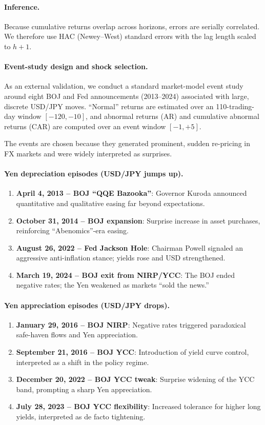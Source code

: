\documentclass[12pt,a4paper]{article}
\begin{document}
\paragraph{Inference.} Because cumulative returns overlap across horizons, errors are serially correlated. We therefore use HAC (Newey--West) standard errors with the lag length scaled to $h+1$.

\paragraph{Event-study design and shock selection.}

As an external validation, we conduct a standard market-model event study \citep{mackinlay1997} around eight BOJ and Fed announcements (2013--2024) associated with large, discrete USD/JPY moves. ``Normal'' returns are estimated over an 110-trading-day window $[-120,-10]$, and abnormal returns (AR) and cumulative abnormal returns (CAR) are computed over an event window $[-1,+5]$.

The events are chosen because they generated prominent, sudden re-pricing in FX markets and were widely interpreted as surprises.

\paragraph{Yen depreciation episodes (USD/JPY jumps up).}
\begin{enumerate}
\item \textbf{April 4, 2013 -- BOJ ``QQE Bazooka''}: Governor Kuroda announced quantitative and qualitative easing far beyond expectations.
\item \textbf{October 31, 2014 -- BOJ expansion}: Surprise increase in asset purchases, reinforcing ``Abenomics''-era easing.
\item \textbf{August 26, 2022 -- Fed Jackson Hole}: Chairman Powell signaled an aggressive anti-inflation stance; yields rose and USD strengthened.
\item \textbf{March 19, 2024 -- BOJ exit from NIRP/YCC}: The BOJ ended negative rates; the Yen weakened as markets ``sold the news.''
\end{enumerate}

\paragraph{Yen appreciation episodes (USD/JPY drops).}
\begin{enumerate}
\item \textbf{January 29, 2016 -- BOJ NIRP}: Negative rates triggered paradoxical safe-haven flows and Yen appreciation.
\item \textbf{September 21, 2016 -- BOJ YCC}: Introduction of yield curve control, interpreted as a shift in the policy regime.
\item \textbf{December 20, 2022 -- BOJ YCC tweak}: Surprise widening of the YCC band, prompting a sharp Yen appreciation.
\item \textbf{July 28, 2023 -- BOJ YCC flexibility}: Increased tolerance for higher long yields, interpreted as de facto tightening.
\end{enumerate}
\end{document}
